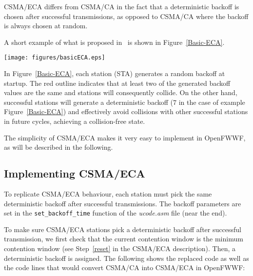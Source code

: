 \documentclass[conference]{IEEEtran}
\begin{document}
CSMA/ECA differs from CSMA/CA in the fact that a deterministic backoff is chosen after successful transmissions, as opposed to CSMA/CA where the backoff is always chosen at random.

A short example of what is proposed in~\cite{barcelo2008lba} is shown in Figure~\ref{Basic-ECA}.


\begin{figure*}[t]
\centering
  \texttt{[image: figures/basicECA.eps]}
  \caption{CSMA/ECA example in saturation}
  \label{Basic-ECA}
\end{figure*}

In Figure~\ref{Basic-ECA}, each station (STA) generates a random backoff at startup. The red outline indicates that at least two of the generated backoff values are the same and stations will consequently collide. On the other hand, successful stations will generate a deterministic backoff ($7$ in the case of example Figure~\ref{Basic-ECA}) and effectively avoid collisions with other successful stations in future cycles, achieving a collision-free state.


The simplicity of CSMA/ECA makes it very easy to implement in OpenFWWF, as will be described in the following.

\subsection{Implementing CSMA/ECA}
To replicate CSMA/ECA behaviour, each station must pick the same deterministic backoff after successful transmissions. The backoff parameters are set in the \texttt{set\_backoff\_time} function of the \emph{ucode.asm} file (near the end).

To make sure CSMA/ECA stations pick a deterministic backoff after successful transmission, we first check that the current contention window is the minimum contention window (see Step~\ref{reset} in the CSMA/ECA description). Then, a deterministic backoff is assigned. The following shows the replaced code as well as the code lines that would convert CSMA/CA into CSMA/ECA in OpenFWWF:
\end{document}
